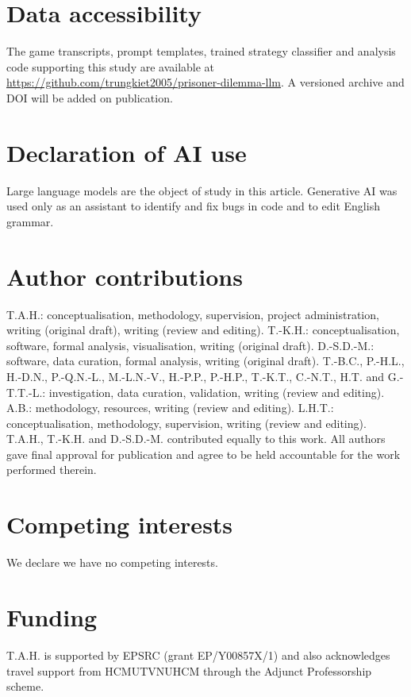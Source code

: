 \documentclass[11pt,a4paper]{article}
\begin{document}
\section*{Data accessibility}
The game transcripts, prompt templates, trained strategy classifier and analysis code supporting this study are available at
\url{https://github.com/trungkiet2005/prisoner-dilemma-llm}. A versioned archive and DOI will be added on publication.

\section*{Declaration of AI use}
Large language models are the object of study in this article. Generative AI was used only as an assistant to identify and fix bugs in code and to edit English grammar.

\section*{Author contributions}
T.A.H.: conceptualisation, methodology, supervision, project administration, writing (original draft), writing (review and editing).
T.-K.H.: conceptualisation, software, formal analysis, visualisation, writing (original draft).
D.-S.D.-M.: software, data curation, formal analysis, writing (original draft).
T.-B.C., P.-H.L., H.-D.N., P.-Q.N.-L., M.-L.N.-V., H.-P.P., P.-H.P., T.-K.T., C.-N.T., H.T. and G.-T.T.-L.: investigation, data curation, validation, writing (review and editing).
A.B.: methodology, resources, writing (review and editing).
L.H.T.: conceptualisation, methodology, supervision,  writing (review and editing).
T.A.H., T.-K.H. and D.-S.D.-M. contributed equally to this work.
All authors gave final approval for publication and agree to be held accountable for the work performed therein.

\section*{Competing interests}
We declare we have no competing interests.

\section*{Funding}
T.A.H. is supported by EPSRC (grant EP/Y00857X/1) and also acknowledges travel support from HCMUT\text{-}VNUHCM through the Adjunct Professorship scheme.



\end{document}
